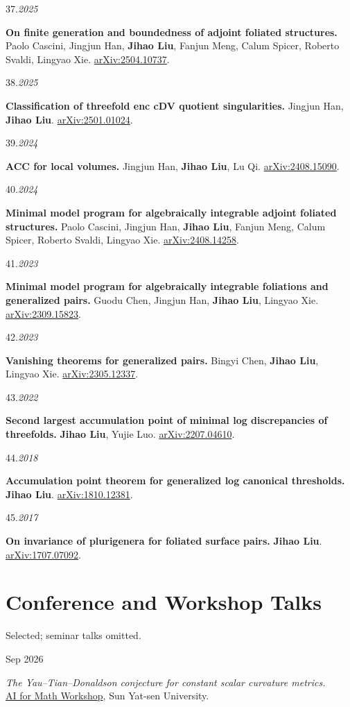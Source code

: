 \documentclass[11pt]{article}
\newcommand{\cvsection}[2]{%
  \Needspace{5\baselineskip}%
  \pdfbookmark[1]{#1}{#2}%
  \section*{#1}%
}
\newlength{\datewidth}
\newcommand{\entry}[2]{%
  \noindent
  \begin{minipage}[t]{\datewidth}
    \raggedright\small\color{muted}#1
  \end{minipage}%
  \hfill%
  \begin{minipage}[t]{\dimexpr\linewidth-\datewidth-0.1in\relax}
    \raggedright #2
  \end{minipage}\par\vspace{4pt}
}
\newcommand{\pubitem}[3]{%
  \noindent
  \begin{minipage}[t]{\datewidth}
    \raggedright\small\color{muted}#1.\;\textit{#2}
  \end{minipage}%
  \hfill%
  \begin{minipage}[t]{\dimexpr\linewidth-\datewidth-0.1in\relax}
    \raggedright #3
  \end{minipage}\par\vspace{4pt}
}
\newcommand{\paper}[1]{\textbf{#1}}
\newcommand{\me}{\textbf{Jihao Liu}}
\begin{document}
\pubitem{37}{2025}{%
  \paper{On finite generation and boundedness of adjoint foliated structures.}
  Paolo Cascini, Jingjun Han, \me, Fanjun Meng, Calum Spicer, Roberto Svaldi, Lingyao Xie.
  \href{https://arxiv.org/abs/2504.10737}{arXiv:2504.10737}.}


\pubitem{38}{2025}{%
  \paper{Classification of threefold enc cDV quotient singularities.}
  Jingjun Han, \me.
  \href{https://arxiv.org/abs/2501.01024}{arXiv:2501.01024}.}


\pubitem{39}{2024}{%
  \paper{ACC for local volumes.}
  Jingjun Han, \me, Lu Qi.
  \href{https://arxiv.org/abs/2408.15090}{arXiv:2408.15090}.}


\pubitem{40}{2024}{%
  \paper{Minimal model program for algebraically integrable adjoint foliated structures.}
  Paolo Cascini, Jingjun Han, \me, Fanjun Meng, Calum Spicer, Roberto Svaldi, Lingyao Xie.
  \href{https://arxiv.org/abs/2408.14258}{arXiv:2408.14258}.}


\pubitem{41}{2023}{%
  \paper{Minimal model program for algebraically integrable foliations and generalized pairs.}
  Guodu Chen, Jingjun Han, \me, Lingyao Xie.
  \href{https://arxiv.org/abs/2309.15823}{arXiv:2309.15823}.}


\pubitem{42}{2023}{%
  \paper{Vanishing theorems for generalized pairs.}
  Bingyi Chen, \me, Lingyao Xie.
  \href{https://arxiv.org/abs/2305.12337}{arXiv:2305.12337}.}


\pubitem{43}{2022}{%
  \paper{Second largest accumulation point of minimal log discrepancies of threefolds.}
  \me, Yujie Luo.
  \href{https://arxiv.org/abs/2207.04610}{arXiv:2207.04610}.}


\pubitem{44}{2018}{%
  \paper{Accumulation point theorem for generalized log canonical thresholds.}
  \me.
  \href{https://arxiv.org/abs/1810.12381}{arXiv:1810.12381}.}


\pubitem{45}{2017}{%
  \paper{On invariance of plurigenera for foliated surface pairs.}
  \me.
  \href{https://arxiv.org/abs/1707.07092}{arXiv:1707.07092}.}


\cvsection{Conference and Workshop Talks}{talks}
{\small\color{muted}\noindent Selected; seminar talks omitted.}\par\vspace{4pt}

\entry{Sep 2026}{\emph{The Yau--Tian--Donaldson conjecture for constant scalar curvature metrics.}\\ \href{https://math.sysu.edu.cn/gagp/article/126}{AI for Math Workshop}, Sun Yat-sen University.}
\end{document}
